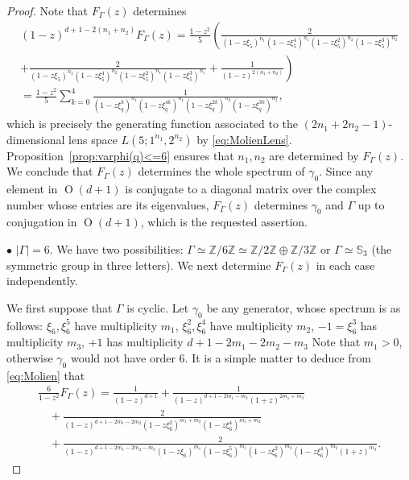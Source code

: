 \documentclass[12pt,a4paper,final]{amsart}
\theoremstyle{plain}
\theoremstyle{definition}
\theoremstyle{remark}
\numberwithin{equation}{section}
\newcommand{\Z}{\mathbb Z}
\DeclareMathOperator{\Ot}{O}
\begin{document}
\begin{proof}
Note that $F_{\Gamma}(z)$ determines 
\begin{multline}\label{eq:verification}
(1-z)^{d+1-2(n_1+n_2)} F_{\Gamma}(z)
=\frac{1-z^2}{5} 
\left(
	\frac{2}{ (1-z\xi_5)^{n_1}(1-z\xi_5^4)^{n_1}	(1-z\xi_5^2)^{n_2}(1-z\xi_5^3)^{n_2} }
\right.
\\ 
\left.
	+ \frac{2}{(1-z\xi_5)^{n_2} (1-z\xi_5^4)^{n_2} (1-z\xi_5^2)^{n_1}(1-z\xi_5^3)^{n_1}}
	+ \frac{1}{(1-z)^{2(n_1+n_2)}}
\right)
%
%
%
\\
=\frac{1-z^2}{5} \sum_{k=0}^{4} 
	\frac{1}{(1-z\xi_q^{k})^{n_1} (1-z\xi_q^{4k})^{n_1} (1-z\xi_q^{2k})^{n_2} (1-z\xi_q^{3k})^{n_2}}
	,
\end{multline}
which is precisely the generating function associated to the $(2n_1+2n_2-1)$-dimensional lens space $L(5;1^{n_1},2^{n_2})$ by \eqref{eq:MolienLens}. 
Proposition~\ref{prop:varphi(q)<=6} ensures that $n_1,n_2$ are determined by $F_{\Gamma}(z)$. 
We conclude that $F_{\Gamma}(z)$ determines the whole spectrum of $\gamma_0$.
Since any element in $\Ot(d+1)$ is conjugate to a diagonal matrix over the complex number whose entries are its eigenvalues, $F_{\Gamma}(z)$ determines $\gamma_0$ and $\Gamma$ up to conjugation in $\Ot(d+1)$, which is the requested assertion. 





 
\medskip\noindent$\bullet$
$|\Gamma|=6$. 
We have two possibilities:  $\Gamma\simeq\Z/6\Z\simeq \Z/2\Z\oplus\Z/3\Z$ or $\Gamma\simeq\mathbb S_3$ (the symmetric group in three letters). 
We next determine $F_{\Gamma}(z)$ in each case independently. 

We first suppose that $\Gamma$ is cyclic. 
Let $\gamma_0$ be any generator, whose spectrum is as follows: 
$\xi_6,\xi_6^5$ have multiplicity $m_1$, 
$\xi_6^2,\xi_6^4$ have multiplicity $m_2$, 
$-1=\xi_6^3$ has multiplicity $m_3$, 
$+1$ has multiplicity $d+1-2m_1-2m_2-m_3$
Note that $m_1>0$, otherwise $\gamma_0$ would not have order $6$. 
It is a simple matter to deduce from \eqref{eq:Molien} that 
\begin{multline}\label{eq6:ciclico}
\frac{6}{1-z^2}F_{\Gamma}(z)
= \frac{1}{(1-z)^{d+1}}
+\frac{1}{(1-z)^{d+1-2m_1-m_3} (1+z)^{2m_1+m_3}  }
\\  \quad
+\frac{2}{(1-z)^{d+1-2m_1-2m_2} (1-z\xi_6^2)^{m_1+m_2} (1-z\xi_6^4)^{m_1+m_2} }
\\  \quad
+\frac{2}{(1-z)^{d+1-2m_1-2m_2-m_3} (1-z\xi_6)^{m_1} (1-z\xi_6^5)^{m_1} (1-z\xi_6^2)^{m_2} (1-z\xi_6^4)^{m_2} (1+z)^{m_3} }
.
\end{multline}


\end{proof}
\end{document}
